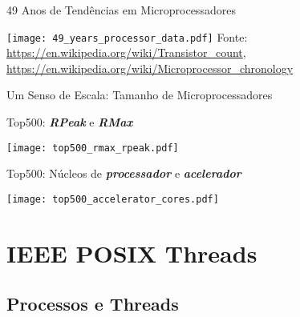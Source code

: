 \documentclass[10pt, compress, aspectratio=169, xcolor={table,usenames,dvipsnames}]{beamer}
\begin{document}
\begin{frame}{49 Anos de Tendências em Microprocessadores}
  \begin{center}
    \texttt{[image: 49\_years\_processor\_data.pdf]}
    \smaller[1]
    Fonte:
    \url{https://en.wikipedia.org/wiki/Transistor_count},
    \url{https://en.wikipedia.org/wiki/Microprocessor_chronology}
  \end{center}
\end{frame}

\begin{frame}{Um Senso de Escala: Tamanho de Microprocessadores}
  \begin{center}
  \end{center}
\end{frame}

\begin{frame}{Top500: \textcolor{NavyBlue}{\textit{\textbf{RPeak}}} e \textcolor{BrickRed}{\textit{\textbf{RMax}}}}
  \begin{center}
    \texttt{[image: top500\_rmax\_rpeak.pdf]}
  \end{center}
\end{frame}

\begin{frame}{Top500: Núcleos de \textcolor{NavyBlue}{\textit{\textbf{processador}}} e
\textcolor{BrickRed}{\textit{\textbf{acelerador}}}}
  \begin{center}
  \texttt{[image: top500\_accelerator\_cores.pdf]}
  \end{center}
\end{frame}

\section{IEEE POSIX Threads}

\subsection{Processos e Threads}
\end{document}
